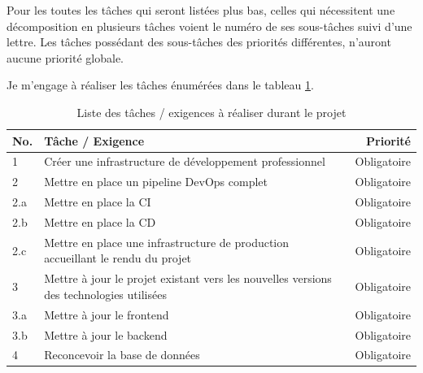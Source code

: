 \documentclass[
    iai, %
    il, %
]{heig-tb}
\begin{document}
Pour les toutes les tâches qui seront listées plus bas, celles qui nécessitent une décomposition en plusieurs tâches voient le numéro de ses sous-tâches suivi d'une lettre. Les tâches possédant des sous-tâches des priorités différentes, n'auront aucune priorité globale.

Je m'engage à réaliser les tâches énumérées dans le tableau \ref{taches}.

\begin{table}[h]
    \begin{center}
        \caption{Liste des tâches / exigences à réaliser durant le projet \label{taches}}
        \begin{tabularx}{1.0\textwidth} {l|X|r}
            No. & Tâche / Exigence                                                                                                       & Priorité      \\ \hline
            1   & Créer une infrastructure de développement professionnel                                                                & Obligatoire   \\
            2   & Mettre en place un pipeline DevOps complet                                                                             & Obligatoire   \\
            2.a & Mettre en place la CI                                                                                                  & Obligatoire   \\
            2.b & Mettre en place la CD                                                                                                  & Obligatoire   \\
            2.c & Mettre en place une infrastructure de production accueillant le rendu du projet                                        & Obligatoire   \\
            3   & Mettre à jour le projet existant vers les nouvelles versions des technologies utilisées                                & Obligatoire   \\
            3.a & Mettre à jour le frontend                                                                                              & Obligatoire   \\
            3.b & Mettre à jour le backend                                                                                               & Obligatoire   \\
            4   & Reconcevoir la base de données                                                                                         & Obligatoire   \\

\end{tabularx}
\end{center}
\end{table}
\end{document}
